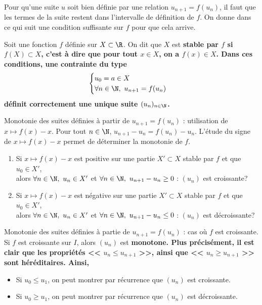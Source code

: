 \documentclass[11pt]{article}
\begin{document}
\quad Pour qu'une suite $u$ soit bien définie par une relation $u_{n+1}=f(u_n)$, il faut que les termes de la suite restent dans l'intervalle de définition de $f$. On donne dans ce qui suit une condition suffisante sur $f$ pour que cela arrive.

\begin{prop}{}{}
    Soit une fonction $f$ définie sur $X\subset\R$. On dit que $X$ est \bf{stable} par $f$ si $f(X)\subset X$, c'est à dire que pour tout $x\in X$, on a $f(x)\in X$. Dans ces conditions, une contrainte du type
    \begin{equation*}
        \begin{cases}
            u_0 = a\in X\\
            \forall n \in \N, ~ u_{n+1} = f(u_n)
        \end{cases}
    \end{equation*}
    définit correctement une unique suite $(u_n)_{n\in\N}$.
\end{prop}

\begin{meth}{Monotonie des suites définies à partir de $u_{n+1}=f(u_n)$ : utilisation de $x\mapsto f(x) - x$.}{}
    Pour tout $n\in\N$, $u_{n+1}-u_n=f(u_n)-u_n$. L'étude du signe de $x\mapsto f(x)-x$ permet de déterminer la monotonie de $f$.
    \begin{enumerate}
        \item Si $x\mapsto f(x)-x$ est positive sur une partie $X'\subset X$ stable par $f$ et que $u_0\in X'$,\\
        alors $\forall n\in\N, ~ u_n\in X'$ et $\forall n\in \N, ~ u_{n+1}-u_n \geq 0$ : $(u_n)$ est croissante?
        \item Si $x\mapsto f(x)-x$ est négative sur une partie $X'\subset X$ stable par $f$ et que $u_0\in X'$,\\
        alors $\forall n\in\N, ~ u_n\in X'$ et $\forall n\in \N, ~ u_{n+1}-u_n \leq 0$ : $(u_n)$ est décroissante?
    \end{enumerate}
\end{meth}

\begin{meth}{Monotonie des suites définies à partie de $u_{n+1}=f(u_n)$ : cas où $f$ est croissante.}{}
    Si $f$ est croissante sur $I$, alors $(u_n)$ est \bf{monotone}. Plus précisément, il est clair que les propriétés << $u_n \leq u_{n+1}$ >>, ainsi que << $u_n \geq u_{n+1}$ >> sont héréditaires. Ainsi,
    \begin{itemize}
        \item Si $u_0 \leq u_1$, on peut montrer par récurrence que $(u_n)$ est croissante.
        \item Si $u_0 \geq u_1$, on peut montrer par récurrence que $(u_n)$ est décroissante.
    \end{itemize}
\end{meth}
\end{document}
